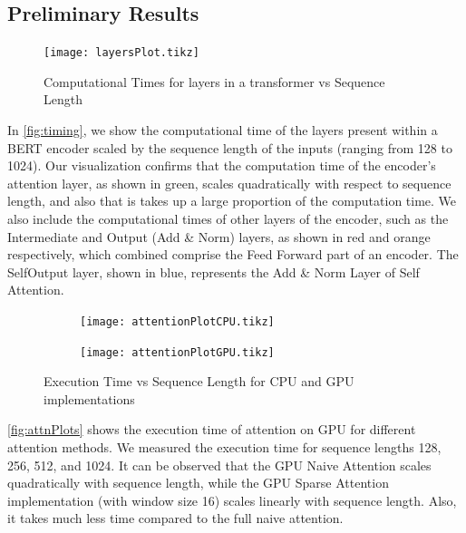 \documentclass[11pt]{article}
\begin{document}
\subsection{Preliminary Results}
\begin{figure} [H]
\testdata
    \centering
    \texttt{[image: layersPlot.tikz]}
    \caption{Computational Times for layers in a transformer vs Sequence Length}
    \label{fig:timing}
\end{figure}
In \autoref{fig:timing}, we show the computational time of the layers present within a BERT encoder scaled by the sequence length of the inputs (ranging from 128 to 1024). Our visualization confirms that the computation time of the encoder's attention layer, as shown in green, scales quadratically with respect to sequence length, and also that is takes up a large proportion of the computation time. 
We also include the computational times of other layers of the encoder, such as the Intermediate and Output (Add \& Norm) layers, as shown in red and orange respectively, which combined comprise the Feed Forward part of an encoder. The SelfOutput layer, shown in blue, represents the Add \& Norm Layer of Self Attention.

\begin{figure} [H]
\centering
\begin{subfigure}{.5\textwidth}
  \centering
  \texttt{[image: attentionPlotCPU.tikz]}
  \label{fig:attnCPU}
\end{subfigure}%
\begin{subfigure}{.5\textwidth}
  \centering
  \texttt{[image: attentionPlotGPU.tikz]}
  \label{fig:attnGPU}
\end{subfigure}
\caption{Execution Time vs Sequence Length for CPU and GPU implementations}
\label{fig:attnPlots}
\end{figure}

\autoref{fig:attnPlots} shows the execution time of attention on GPU for different attention methods. We measured the execution time for sequence lengths 128, 256, 512, and 1024. It can be observed that the GPU Naive Attention scales quadratically with sequence length, while the GPU Sparse Attention implementation (with window size 16) scales linearly with sequence length. Also, it takes much less time compared to the full naive attention.
\end{document}
